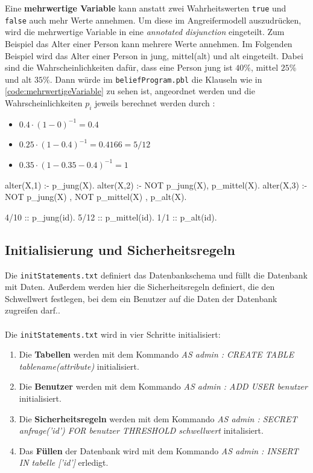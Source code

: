\documentclass[german,version-2020-11]{uzl-thesis}
\begin{document}
Eine \textbf{mehrwertige Variable} kann anstatt zwei Wahrheitswerten \texttt{true} und \texttt{false} auch mehr Werte annehmen.
Um diese im Angreifermodell auszudrücken, wird die mehrwertige Variable in eine \textit{annotated disjunction} eingeteilt. Zum Beispiel das Alter einer Person kann mehrere Werte annehmen. Im Folgenden Beispiel wird das Alter einer Person in jung, mittel(alt) und alt eingeteilt. Dabei sind die Wahrscheinlichkeiten dafür, dass eine Person jung ist $40\%$, mittel $25\%$ und alt $35\%$. Dann würde im \texttt{beliefProgram.pbl} die Klauseln wie in \autoref{code:mehrwertigeVariable} zu sehen ist, angeordnet werden und die Wahrscheinlichkeiten $p_i$ jeweils berechnet werden durch : 
\begin{itemize}
	\item $0.4 \cdot (1- 0)^{-1} = 0.4 $
	\item  $0.25 \cdot (1 - 0.4)^{-1} = 0.4166 = 5/12 $
	\item $ 0.35 \cdot (1 - 0.35 - 0.4)^{-1} = 1 $
\end{itemize}
\begin{Pseudocode}[caption={Beispiel für mehrwertige Variablen}, label={code:mehrwertigeVariable}]
alter(X,1) :- p_jung(X).
alter(X,2) :- NOT p_jung(X), p_mittel(X).
alter(X,3) :- NOT p_jung(X) , NOT p_mittel(X) , p_alt(X).

4/10 :: p_jung(id).
5/12 :: p_mittel(id).
1/1 :: p_alt(id).
\end{Pseudocode} 


\subsection{Initialisierung und Sicherheitsregeln}
Die \texttt{initStatements.txt} definiert das Datenbankschema und füllt die Datenbank mit Daten. Außerdem werden hier die Sicherheitsregeln definiert, die den Schwellwert festlegen, bei dem ein Benutzer auf die Daten der Datenbank zugreifen darf.. \\ \\  
Die \texttt{initStatements.txt} wird in vier Schritte initialisiert:
\begin{enumerate}
	\item Die \textbf{Tabellen } werden mit dem Kommando \textit{AS admin : CREATE TABLE tablename(attribute)} initialisiert. 
	\item  Die \textbf{Benutzer} werden mit dem Kommando \textit{AS admin : ADD USER benutzer} initialisiert. 
	\item Die \textbf{Sicherheitsregeln}  werden mit dem Kommando \textit{AS admin : SECRET anfrage('id') FOR benutzer THRESHOLD schwellwert} initalisiert.
	\item Das \textbf{Füllen} der Datenbank wird mit dem Kommando \textit{AS admin : INSERT IN tabelle ['id']} erledigt.
\end{enumerate} 
\end{document}
